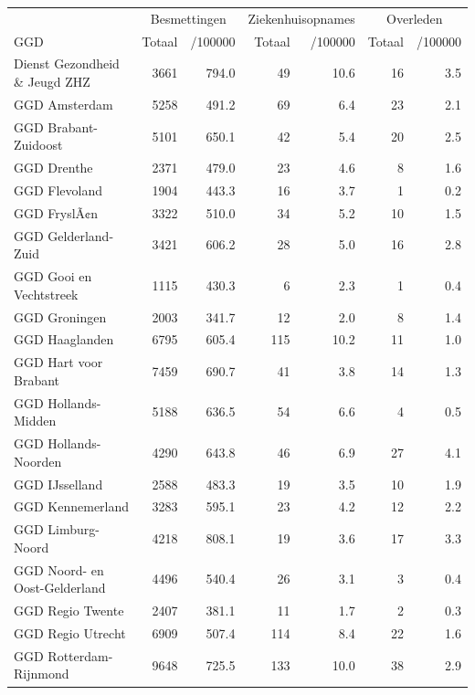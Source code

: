 \documentclass[
  english,
  man,floatsintext]{apa6}
\begin{document}
\begin{table}
\centering\begingroup\fontsize{10}{12}\selectfont

\begin{threeparttable}
\begin{tabular}{lrrrrrr}
\toprule
\multicolumn{1}{c}{ } & \multicolumn{2}{c}{Besmettingen} & \multicolumn{2}{c}{Ziekenhuisopnames} & \multicolumn{2}{c}{Overleden} \\
\cmidrule(l{3pt}r{3pt}){2-3} \cmidrule(l{3pt}r{3pt}){4-5} \cmidrule(l{3pt}r{3pt}){6-7}
GGD & Totaal & /100000 & Totaal & /100000 & Totaal & /100000\\
\midrule
Dienst Gezondheid \& Jeugd ZHZ & 3661 & 794.0 & 49 & 10.6 & 16 & 3.5\\
GGD Amsterdam & 5258 & 491.2 & 69 & 6.4 & 23 & 2.1\\
GGD Brabant-Zuidoost & 5101 & 650.1 & 42 & 5.4 & 20 & 2.5\\
GGD Drenthe & 2371 & 479.0 & 23 & 4.6 & 8 & 1.6\\
GGD Flevoland & 1904 & 443.3 & 16 & 3.7 & 1 & 0.2\\
GGD FryslÃ¢n & 3322 & 510.0 & 34 & 5.2 & 10 & 1.5\\
GGD Gelderland-Zuid & 3421 & 606.2 & 28 & 5.0 & 16 & 2.8\\
GGD Gooi en Vechtstreek & 1115 & 430.3 & 6 & 2.3 & 1 & 0.4\\
GGD Groningen & 2003 & 341.7 & 12 & 2.0 & 8 & 1.4\\
GGD Haaglanden & 6795 & 605.4 & 115 & 10.2 & 11 & 1.0\\
GGD Hart voor Brabant & 7459 & 690.7 & 41 & 3.8 & 14 & 1.3\\
GGD Hollands-Midden & 5188 & 636.5 & 54 & 6.6 & 4 & 0.5\\
GGD Hollands-Noorden & 4290 & 643.8 & 46 & 6.9 & 27 & 4.1\\
GGD IJsselland & 2588 & 483.3 & 19 & 3.5 & 10 & 1.9\\
GGD Kennemerland & 3283 & 595.1 & 23 & 4.2 & 12 & 2.2\\
GGD Limburg-Noord & 4218 & 808.1 & 19 & 3.6 & 17 & 3.3\\
GGD Noord- en Oost-Gelderland & 4496 & 540.4 & 26 & 3.1 & 3 & 0.4\\
GGD Regio Twente & 2407 & 381.1 & 11 & 1.7 & 2 & 0.3\\
GGD Regio Utrecht & 6909 & 507.4 & 114 & 8.4 & 22 & 1.6\\
GGD Rotterdam-Rijnmond & 9648 & 725.5 & 133 & 10.0 & 38 & 2.9\\

\end{tabular}
\end{threeparttable}
\end{table}
\end{document}

